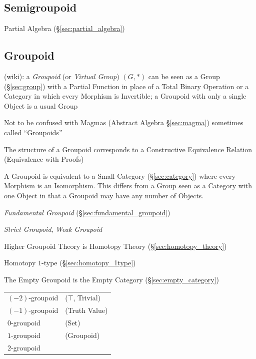 \subsection{Semigroupoid}\label{sec:semigroupoid}

Partial Algebra (\S\ref{sec:partial_algebra})



\subsection{Groupoid}\label{sec:groupoid}

(wiki): a \emph{Groupoid} (or \emph{Virtual Group}) $(G,*)$ can be seen as a
Group (\S\ref{sec:group}) with a Partial Function in place of a Total Binary
Operation or a Category in which every Morphism is Invertible; a Groupoid with
only a single Object is a usual Group

\fist Not to be confused with Magmas (Abstract Algebra \S\ref{sec:magma})
sometimes called ``Groupoids''

The structure of a Groupoid corresponds to a Constructive Equivalence
Relation (Equivalence with Proofs)

A Groupoid is equivalent to a Small Category (\S\ref{sec:category}) where every
Morphism is an Isomorphism. This differs from a Group seen as a Category with
one Object in that a Groupoid may have any number of Objects.

\emph{Fundamental Groupoid} (\S\ref{sec:fundamental_groupoid})

\emph{Strict Groupoid}, \emph{Weak Groupoid}

Higher Groupoid Theory is Homotopy Theory (\S\ref{sec:homotopy_theory})

Homotopy $1$-type (\S\ref{sec:homotopy_1type})

The Empty Groupoid is the Empty Category (\S\ref{sec:empty_category})

\begin{tabular}{l l}
  $(-2)$-groupoid & ($\top$, Trivial) \\

  $(-1)$-groupoid & (Truth Value) \\

  $0$-groupoid    & (Set) \\

  $1$-groupoid    & (Groupoid) \\

  $2$-groupoid    & \\
\end{tabular}



